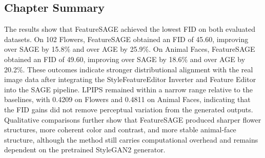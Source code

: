 \subsection{Chapter Summary}

The results show that FeatureSAGE achieved the lowest FID on both evaluated datasets. On 102 Flowers, FeatureSAGE obtained an FID of 45.60, improving over SAGE by 15.8\% and over AGE by 25.9\%. On Animal Faces, FeatureSAGE obtained an FID of 49.60, improving over SAGE by 18.6\% and over AGE by 20.2\%. These outcomes indicate stronger distributional alignment with the real image data after integrating the StyleFeatureEditor Inverter and Feature Editor into the SAGE pipeline. LPIPS remained within a narrow range relative to the baselines, with 0.4209 on Flowers and 0.4811 on Animal Faces, indicating that the FID gains did not remove perceptual variation from the generated outputs. Qualitative comparisons further show that FeatureSAGE produced sharper flower structures, more coherent color and contrast, and more stable animal-face structure, although the method still carries computational overhead and remains dependent on the pretrained StyleGAN2 generator.
